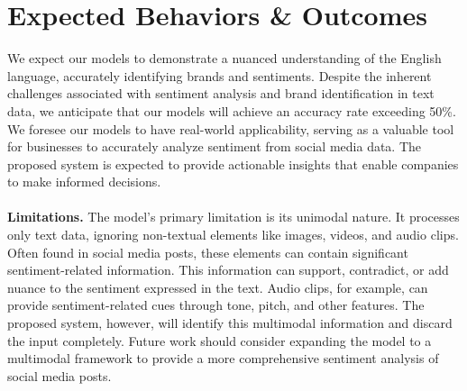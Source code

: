 \documentclass{article}
\begin{document}
\section*{Expected Behaviors \& Outcomes}
We expect our models to demonstrate a nuanced understanding of the English
language, accurately identifying brands and sentiments. Despite the inherent
challenges associated with sentiment analysis and brand identification in text
data, we anticipate that our models will achieve an accuracy rate exceeding
50\%. We foresee our models to have real-world applicability, serving as a
valuable tool for businesses to accurately analyze sentiment from social media
data. The proposed system is expected to provide actionable insights that
enable companies to make informed decisions.\\
\\
\textbf{Limitations.} The model's primary limitation is its unimodal nature. It
processes only text data, ignoring non-textual elements like images, videos,
and audio clips. Often found in social media posts, these elements can contain
significant sentiment-related information. This information can support,
contradict, or add nuance to the sentiment expressed in the text. Audio clips,
for example, can provide sentiment-related cues through tone, pitch, and other
features. The proposed system, however, will identify this multimodal
information and discard the input completely. Future work should consider
expanding the model to a multimodal framework to provide a more comprehensive
sentiment analysis of social media posts.

\newpage
\end{document}
